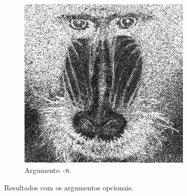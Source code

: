 \begin{figure}[H]
\begin{subfigure}{0.48\textwidth}
            \includegraphics[width=0.9\textwidth]{resultados/baboon_h1n.png}
            \caption{Argumento \texttt{-n}.}
            \label{fig:opt:n}
        \end{subfigure}

        \caption{Resultados com os argumentos opcionais.}
        \label{fig:opt}
    \end{figure}

